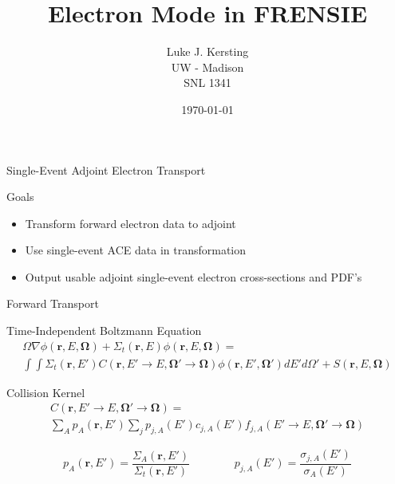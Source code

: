 \documentclass{beamer}
\author{Luke J. Kersting
\\ UW - Madison
\\ SNL 1341
}
\date{\today}
\title{Electron Mode in FRENSIE}
\begin{document}
\maketitle

\begin{frame}{Single-Event Adjoint Electron Transport}

\begin{block}{Goals}
	\begin{itemize}
	\item Transform forward electron data to adjoint
	\item Use single-event ACE data in transformation
	\item Output usable adjoint single-event electron cross-sections and PDF's
	\end{itemize}

\end{block}

\end{frame}

\begin{frame}{Forward Transport}
\begin{block}{Time-Independent Boltzmann Equation}
\begin{multline}
  \Omega \nabla \phi(\boldsymbol r,E,\boldsymbol\Omega) + 
  \Sigma_t(\boldsymbol{r},E)\phi(\boldsymbol{r},E,\boldsymbol{\Omega}) = \\
  \int\int\Sigma_t(\boldsymbol{r},E')C(\boldsymbol{r},E'\rightarrow E,\boldsymbol{\Omega'}\rightarrow\boldsymbol{\Omega})\phi(\boldsymbol{r},E',\boldsymbol{\Omega'})dE'd\Omega' + 
  S(\boldsymbol{r},E,\boldsymbol{\Omega})
\end{multline}
\end{block}

\begin{block}{Collision Kernel}
\begin{multline}
C(\boldsymbol{r},E'\rightarrow E,\boldsymbol{\Omega'}\rightarrow\boldsymbol{\Omega}) = \\
\sum_A p_A(\boldsymbol{r},E') \sum_j p_{j,A}(E') c_{j,A}(E') f_{j,A}(E'\rightarrow E,\boldsymbol{\Omega'}\rightarrow\boldsymbol{\Omega})
\end{multline}

\begin{equation}
p_A(\boldsymbol{r},E') = \frac{\Sigma_A(\boldsymbol{r},E')}{\Sigma_t(\boldsymbol{r},E')}
~~~~~~~~~~~~~~~~~~
p_{j,A}(E') = \frac{\sigma_{j,A}(E')}{\sigma_A(E')} \nonumber
\end{equation}

\end{block}

\end{frame}
\end{document}
